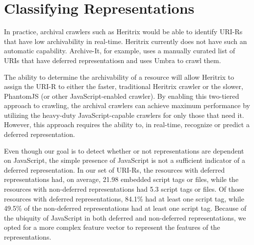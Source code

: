 \documentclass{ipres_proc_article-sp}
\begin{document}
\section{Classifying Representations}
\label{classifying}

In practice, archival crawlers such as Heritrix would be able to identify URI-Rs that have low archivability in real-time. Heritrix currently does not have such an automatic capability. Archive-It, for example, uses a manually curated list of URIs that have deferred representatiosn and uses Umbra \cite{umbra} to crawl them.

The ability to determine the archivability of a resource will allow Heritrix to assign the URI-R to either the faster, traditional Heritrix crawler or the slower,  PhantomJS (or other JavaScript-enabled crawler). By enabling this two-tiered approach to crawling, the archival crawlers can achieve maximum performance by utilizing the heavy-duty JavaScript-capable crawlers for only those that need it. However, this approach requires the ability to, in real-time, recognize or predict a deferred representation.


Even though our goal is to detect whether or not representations are dependent on JavaScript, the simple presence of JavaScript is not a sufficient indicator of a deferred representation. In our set of URI-Rs, the resources with deferred representations had, on average, 21.98 embedded script tags or files, while the resources with non-deferred representations had 5.3 script tags or files. Of those resources with deferred representations, 84.1\% had at least one script tag, while 49.5\% of the non-deferred representations had at least one script tag. Because of the ubiquity of JavaScript in both deferred and non-deferred representations, we opted for a more complex feature vector to represent the features of the representations.
\end{document}
